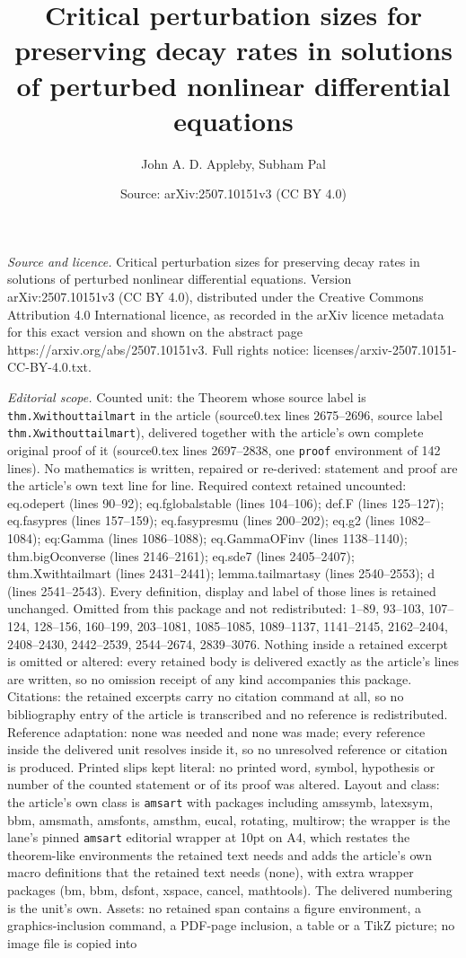 \documentclass[10pt,a4paper]{amsart}
\title[Critical perturbation sizes for preserving decay rates in so]{Critical perturbation sizes for preserving decay rates in solutions of perturbed nonlinear differential equations}
\author{John A. D. Appleby, Subham Pal}
\date{Source: arXiv:2507.10151v3 (CC BY 4.0)}
\begin{document}
\maketitle

\noindent\emph{Source and licence.} Critical perturbation sizes for preserving decay rates in solutions of perturbed nonlinear differential equations. Version arXiv:2507.10151v3 (CC BY 4.0), distributed under the Creative Commons Attribution 4.0 International licence, as recorded in the arXiv licence metadata for this exact version and shown on the abstract page https://arxiv.org/abs/2507.10151v3. Full rights notice: licenses/arxiv-2507.10151-CC-BY-4.0.txt.\par\smallskip

\noindent\textit{Editorial scope.} Counted unit: the Theorem whose source label is \texttt{thm.Xwithouttailmart} in the article (source0.tex lines 2675--2696, source label \texttt{thm.Xwithouttailmart}), delivered together with the article's own complete original proof of it (source0.tex lines 2697--2838, one \texttt{proof} environment of 142 lines). No mathematics is written, repaired or re-derived: statement and proof are the article's own text line for line. Required context retained uncounted: eq.odepert (lines 90--92); eq.fglobalstable (lines 104--106); def.F (lines 125--127); eq.fasypres (lines 157--159); eq.fasypresmu (lines 200--202); eq.g2 (lines 1082--1084); eq:Gamma (lines 1086--1088); eq.GammaOFinv (lines 1138--1140); thm.bigOconverse (lines 2146--2161); eq.sde7 (lines 2405--2407); thm.Xwithtailmart (lines 2431--2441); lemma.tailmartasy (lines 2540--2553); d (lines 2541--2543). Every definition, display and label of those lines is retained unchanged. Omitted from this package and not redistributed: 1--89, 93--103, 107--124, 128--156, 160--199, 203--1081, 1085--1085, 1089--1137, 1141--2145, 2162--2404, 2408--2430, 2442--2539, 2544--2674, 2839--3076. Nothing inside a retained excerpt is omitted or altered: every retained body is delivered exactly as the article's lines are written, so no omission receipt of any kind accompanies this package. Citations: the retained excerpts carry no citation command at all, so no bibliography entry of the article is transcribed and no reference is redistributed. Reference adaptation: none was needed and none was made; every reference inside the delivered unit resolves inside it, so no unresolved reference or citation is produced. Printed slips kept literal: no printed word, symbol, hypothesis or number of the counted statement or of its proof was altered. Layout and class: the article's own class is \texttt{amsart} with packages including amssymb, latexsym, bbm, amsmath, amsfonts, amsthm, eucal, rotating, multirow; the wrapper is the lane's pinned \texttt{amsart} editorial wrapper at 10pt on A4, which restates the theorem-like environments the retained text needs and adds the article's own macro definitions that the retained text needs (none), with extra wrapper packages (bm, bbm, dsfont, xspace, cancel, mathtools). The delivered numbering is the unit's own. Assets: no retained span contains a figure environment, a graphics-inclusion command, a PDF-page inclusion, a table or a TikZ picture; no image file is copied into 
\end{document}
